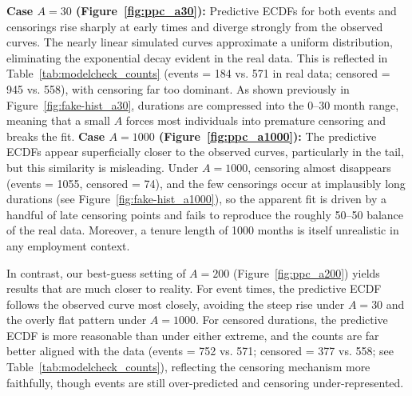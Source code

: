 \textbf{Case $A=30$ (Figure~\ref{fig:ppc_a30}):} Predictive ECDFs for both events and censorings rise sharply at early times and diverge strongly from the observed curves. The nearly linear simulated curves approximate a uniform distribution, eliminating the exponential decay evident in the real data. This is reflected in Table~\ref {tab:modelcheck_counts} (events = 184 vs. 571 in real data; censored = 945 vs. 558), with censoring far too dominant. As shown previously in Figure~\ref{fig:fake-hist_a30}, durations are compressed into the 0–30 month range, meaning that a small $A$ forces most individuals into premature censoring and breaks the fit. \textbf{Case $A=1000$ (Figure~\ref{fig:ppc_a1000}):} The predictive ECDFs appear superficially closer to the observed curves, particularly in the tail, but this similarity is misleading. Under $A=1000$, censoring almost disappears (events = 1055, censored = 74), and the few censorings occur at implausibly long durations (see Figure~\ref{fig:fake-hist_a1000}), so the apparent fit is driven by a handful of late censoring points and fails to reproduce the roughly 50–50 balance of the real data. Moreover, a tenure length of 1000 months is itself unrealistic in any employment context.

In contrast, our best-guess setting of $A=200$ (Figure~\ref{fig:ppc_a200}) yields results that are much closer to reality. For event times, the predictive ECDF follows the observed curve most closely, avoiding the steep rise under $A=30$ and the overly flat pattern under $A=1000$. For censored durations, the predictive ECDF is more reasonable than under either extreme, and the counts are far better aligned with the data (events = 752 vs. 571; censored = 377 vs. 558; see Table~\ref{tab:modelcheck_counts}), reflecting the censoring mechanism more faithfully, though events are still over-predicted and censoring under-represented.

